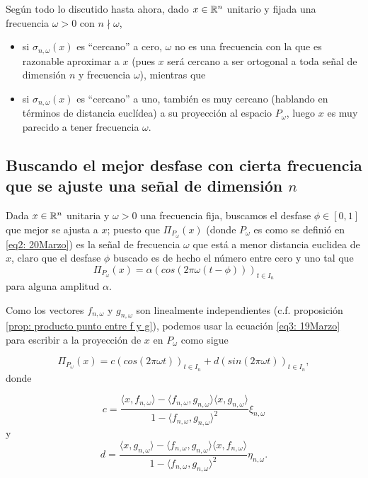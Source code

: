 Según todo lo discutido hasta ahora, dado $x \in \mathbb{R}^{n}$ unitario
y fijada una frecuencia $\omega >0$ con $n \nmid \omega$,
\begin{itemize}
\item si $\sigma_{n, \omega}(x)$ es ``cercano'' a cero, $\omega$ no
es una frecuencia con la que es razonable aproximar a $x$ (pues $x$ será
cercano a ser ortogonal a toda señal de dimensión $n$ y frecuencia 
$\omega$),  mientras que

\item si $\sigma_{n, \omega}(x)$ es ``cercano'' a uno, también es muy cercano
(hablando en términos de distancia euclídea) a su proyección al espacio
$P_{\omega}$, luego $x$ es muy parecido a tener frecuencia $\omega$.
\end{itemize}


\subsection{Buscando el mejor desfase con cierta frecuencia que se ajuste una señal de dimensión $n$}

Dada $x \in \mathbb{R}^{n}$ unitaria y $\omega > 0$ una frecuencia fija, 
buscamos el desfase $\phi \in [0,1]$ que mejor se ajusta a $x$; puesto que
$\Pi_{P_{\omega}}(x)$ (donde $P_{\omega}$ es como se definió en 
\eqref{eq2: 20Marzo}) es la señal de frecuencia $\omega$ que está a menor
distancia euclidea de $x$, claro que el desfase $\phi$ buscado es de hecho
el número entre cero y uno tal que 
\[
\Pi_{P_{\omega}}(x) = \alpha (cos(2 \pi \omega (t - \phi)))_{t \in I_{n}}
\]
para alguna amplitud $\alpha$.

Como los vectores $f_{n, \omega}$ y $g_{n, \omega}$ 
son linealmente independientes (c.f. proposición \ref{prop: producto punto entre f y g}),
podemos usar la ecuación \eqref{eq3: 19Marzo}
para escribir a la proyección de $x$ en $P_{\omega}$ como sigue

\begin{equation}
\label{eq3: 20Marzo}
\Pi_{P_{\omega}}(x)= c (cos (2 \pi \omega t))_{t \in I_{n}} + d 
(sin (2 \pi \omega t))_{t \in I_{n}},
\end{equation}
donde

\begin{equation}
\label{eq4: 20Marzo}
c= \frac{
\langle x, f_{n, \omega} \rangle - \langle f_{n, \omega}, g_{n, \omega} \rangle
\langle x, g_{n, \omega} \rangle
}{1-\langle f_{n, \omega}, g_{n, \omega} \rangle^{2}} \xi_{n, \omega}
\end{equation}
y
\begin{equation}
\label{eq5: 20Marzo}
d= \frac{
\langle x, g_{n, \omega} \rangle - \langle f_{n, \omega}, g_{n, \omega} \rangle
\langle x, f_{n, \omega} \rangle
}{1-\langle f_{n, \omega}, g_{n, \omega} \rangle^{2}} \eta_{n, \omega}.
\end{equation}

